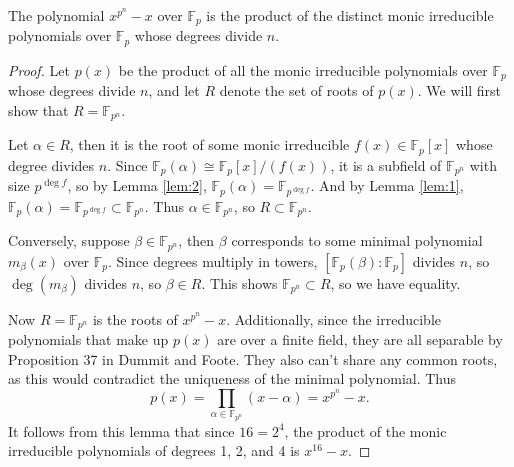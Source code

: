 \documentclass[10pt]{report}
\begin{document}
\begin{lem}
	The polynomial $x^{p^n}-x$ over $\mathbb{F}_{p}$ is the product of the distinct monic irreducible polynomials over $\mathbb{F}_{p}$ whose degrees divide $n$.
\end{lem}
\begin{proof}
	Let $p(x)$ be the product of all the monic irreducible polynomials over $\mathbb{F}_{p}$ whose degrees divide $n$, and let $R$ denote the set of roots of $p(x)$. We will first show that $R = \mathbb{F}_{p^n}$.

	Let $\alpha \in R$, then it is the root of some monic irreducible $f(x) \in \mathbb{F}_{p}[x]$ whose degree divides $n$. Since $\mathbb{F}_{p}(\alpha)\cong \mathbb{F}_{p}[x]/(f(x))$, it is a subfield of $\mathbb{F}_{p^n}$ with size $p^{\deg f}$, so by Lemma \ref{lem:2}, $\mathbb{F}_{p}(\alpha) = \mathbb{F}_{p^{\deg f}}$. And by Lemma \ref{lem:1}, $\mathbb{F}_{p}(\alpha)=\mathbb{F}_{p^{\deg f}} \subset \mathbb{F}_{p^n}.$ Thus $\alpha \in \mathbb{F}_{p^n}$, so $R \subset \mathbb{F}_{p^n}$.

	Conversely, suppose $\beta \in \mathbb{F}_{p^n}$, then $\beta$ corresponds to some minimal polynomial $m_{\beta}(x)$ over $\mathbb{F}_{p}$. Since degrees multiply in towers, $[\mathbb{F}_{p}(\beta):\mathbb{F}_{p}]$ divides $n$, so $\deg(m_{\beta})$ divides $n$, so $\beta \in R$. This shows $\mathbb{F}_{p^n} \subset R$, so we have equality.

	Now $R = \mathbb{F}_{p^n}$ is the roots of $x^{p^n}-x$. Additionally, since the irreducible polynomials that make up $p(x)$ are over a finite field, they are all separable by Proposition 37 in Dummit and Foote. They also can't share any common roots, as this would contradict the uniqueness of the minimal polynomial. Thus
	\[
		p(x) = \prod_{\alpha \in \mathbb{F}_{p^n}}(x-\alpha) = x^{p^n}-x.
	\] 
It follows from this lemma that since $16=2^4$, the product of the monic irreducible polynomials of degrees 1, 2, and 4 is $x^{16}-x$.
\end{proof}
\end{document}

